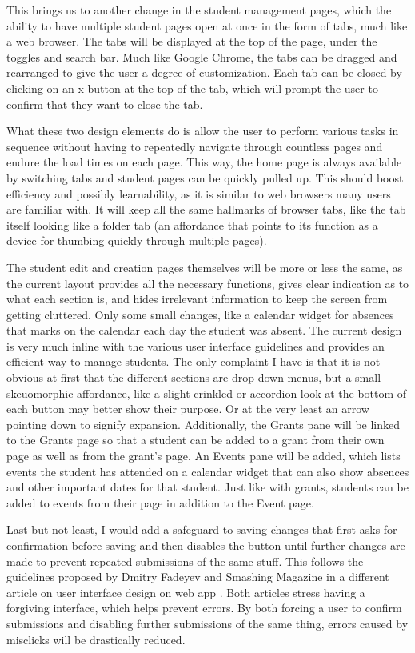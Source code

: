 \documentclass{article}
\begin{document}
This brings us to another change in the student management pages, which the ability to have multiple student pages open at once in the form of tabs, much like a web browser. The tabs will be displayed at the top of the page, under the toggles and search bar. Much like Google Chrome, the tabs can be dragged and rearranged to give the user a degree of customization. Each tab can be closed by clicking on an x button at the top of the tab, which will prompt the user to confirm that they want to close the tab.

What these two design elements do is allow the user to perform various tasks in sequence without having to repeatedly navigate through countless pages and endure the load times on each page. This way, the home page is always available by switching tabs and student pages can be quickly pulled up. This should boost efficiency and possibly learnability, as it is similar to web browsers many users are familiar with. It will keep all the same hallmarks of browser tabs, like the tab itself looking like a folder tab (an affordance that points to its function as a device for thumbing quickly through multiple pages). 

The student edit and creation pages themselves will be more or less the same, as the current layout provides all the necessary functions, gives clear indication as to what each section is, and hides irrelevant information to keep the screen from getting cluttered. Only some small changes, like a calendar widget for absences that marks on the calendar each day the student was absent. The current design is very much inline with the various user interface guidelines and provides an efficient way to manage students. The only complaint I have is that it is not obvious at first that the different sections are drop down menus, but a small skeuomorphic affordance, like a slight crinkled or accordion look at the bottom of each button may better show their purpose. Or at the very least an arrow pointing down to signify expansion. Additionally, the Grants pane will be linked to the Grants page so that a student can be added to a grant from their own page as well as from the grant's page. An Events pane will be added, which lists events the student has attended on a calendar widget that can also show absences and other important dates for that student. Just like with grants, students can be added to events from their page in addition to the Event page.

Last but not least, I would add a safeguard to saving changes that first asks for confirmation before saving and then disables the button until further changes are made to prevent repeated submissions of the same stuff. This follows the guidelines proposed by Dmitry Fadeyev \cite{techniques} and Smashing Magazine in  a different article on user interface design on web app \cite{modern}. Both articles stress having a forgiving interface, which helps prevent errors. By both forcing a user to confirm submissions and disabling further submissions of the same thing, errors caused by misclicks will be drastically reduced.
\end{document}
